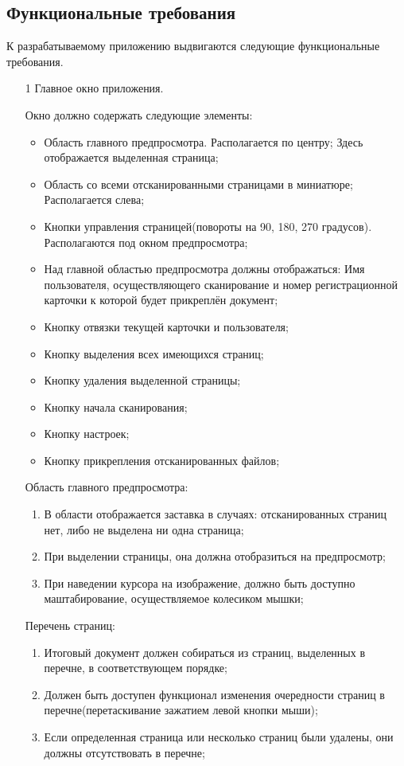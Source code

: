 \subsection{Функциональные требования}

К разрабатываемому приложению выдвигаются следующие функциональные требования.
\begin{enumerate}
\item[1] Главное окно приложения.

Окно должно содержать следующие элементы:
\begin{itemize}
	\item Область главного предпросмотра. Располагается по центру; Здесь отображается выделенная страница;
	\item Область со всеми отсканированными страницами в миниатюре; Располагается слева;
	\item Кнопки управления страницей(повороты на 90, 180, 270 градусов). Располагаются под окном предпросмотра;
	\item Над главной областью предпросмотра должны отображаться: Имя пользователя, осуществляющего сканирование и номер регистрационной карточки к которой будет прикреплён документ;
	\item Кнопку отвязки текущей карточки и пользователя;
	\item Кнопку выделения всех имеющихся страниц;
	\item Кнопку удаления выделенной страницы;
	\item Кнопку начала сканирования;
	\item Кнопку настроек;
	\item Кнопку прикрепления отсканированных файлов; 

\end{itemize}

 \hspace*{2.5em} Область главного предпросмотра: 
\begin{enumerate}
	\item В области отображается заставка в случаях: отсканированных страниц нет, либо не выделена ни одна страница;
  	\item При выделении страницы, она должна отобразиться на предпросмотр;
 	\item При наведении курсора на изображение, должно быть доступно маштабирование, осуществляемое колесиком мышки;
\end{enumerate}

\hspace*{2.5em} Перечень страниц: 
\begin{enumerate}
	\item Итоговый документ должен собираться из страниц, выделенных в перечне, в соответствующем порядке; 
	\item Должен быть доступен функционал изменения очередности страниц в перечне(перетаскивание зажатием левой кнопки мыши); 
	\item Если определенная страница или несколько страниц были удалены, они должны отсутствовать в перечне;
\end{enumerate}


\end{enumerate}
